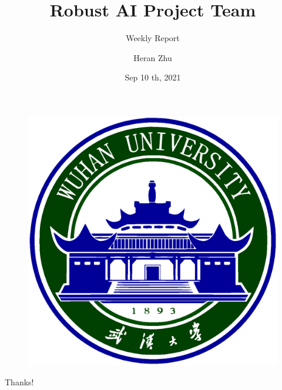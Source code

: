 \documentclass[aspectratio=169]{beamer}
\author{Heran Zhu}
\title{Robust AI Project Team}
\subtitle{Weekly Report}
\institute{Electronic Information School, Wuhan University}
\date{Sep 10 th, 2021}
\begin{document}
\kaishu
\begin{frame}
	\titlepage
	\begin{figure}[htb]
		\begin{center}
			\includegraphics[width=0.1\linewidth]{pic/whulogo.eps}
		\end{center}
	\end{figure}
\end{frame}




% 
% 
% 
% 
% 
% 
% 
% 


% 
% 


% 	
% 	

\begin{frame}
    \begin{center}
        {\Huge Thanks!}
    \end{center}
\end{frame}
\end{document}
